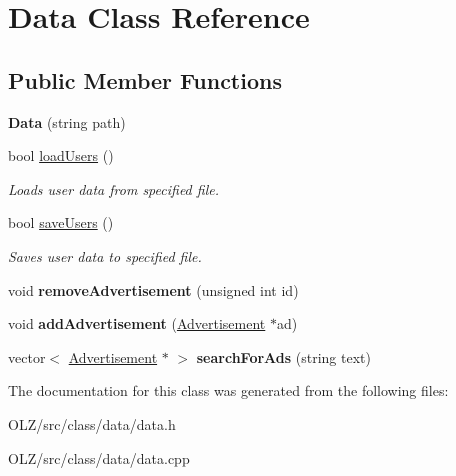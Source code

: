 \hypertarget{class_data}{}\section{Data Class Reference}
\label{class_data}
\subsection*{Public Member Functions}
\begin{DoxyCompactItemize}
\item 
\hypertarget{class_data_a68533b8be01f87fa0f989788da9e6735}{}{\bfseries Data} (string path)\label{class_data_a68533b8be01f87fa0f989788da9e6735}

\item 
\hypertarget{class_data_af6bfff017e2428145e1f723c41f62e55}{}bool \hyperlink{class_data_af6bfff017e2428145e1f723c41f62e55}{load\+Users} ()\label{class_data_af6bfff017e2428145e1f723c41f62e55}

\begin{DoxyCompactList}\small\item\em Loads user data from specified file. \end{DoxyCompactList}\item 
\hypertarget{class_data_aaf1fcf32ff1e5aab2dbdba338740ea41}{}bool \hyperlink{class_data_aaf1fcf32ff1e5aab2dbdba338740ea41}{save\+Users} ()\label{class_data_aaf1fcf32ff1e5aab2dbdba338740ea41}

\begin{DoxyCompactList}\small\item\em Saves user data to specified file. \end{DoxyCompactList}\item 
\hypertarget{class_data_aef09da10593bb91b3ae2f627bfc55951}{}void {\bfseries remove\+Advertisement} (unsigned int id)\label{class_data_aef09da10593bb91b3ae2f627bfc55951}

\item 
\hypertarget{class_data_ae4aa5295e124638182712d68416fc603}{}void {\bfseries add\+Advertisement} (\hyperlink{class_advertisement}{Advertisement} $\ast$ad)\label{class_data_ae4aa5295e124638182712d68416fc603}

\item 
\hypertarget{class_data_a2d154ed7f306a52f9881f28c8a05dd8d}{}vector$<$ \hyperlink{class_advertisement}{Advertisement} $\ast$ $>$ {\bfseries search\+For\+Ads} (string text)\label{class_data_a2d154ed7f306a52f9881f28c8a05dd8d}

\end{DoxyCompactItemize}


The documentation for this class was generated from the following files\+:\begin{DoxyCompactItemize}
\item 
O\+L\+Z/src/class/data/data.\+h\item 
O\+L\+Z/src/class/data/data.\+cpp\end{DoxyCompactItemize}
